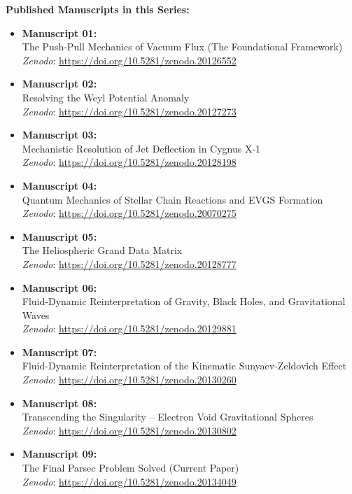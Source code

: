 \documentclass[11pt, a4paper]{article}
\begin{document}
  \vspace{1em}
  \noindent \textbf{Published Manuscripts in this Series:}
  \begin{itemize}
    \item \textbf{Manuscript 01:} \\ The Push-Pull Mechanics of Vacuum Flux (The Foundational Framework) \\ \textit{Zenodo}: \url{https://doi.org/10.5281/zenodo.20126552}
    
    \item \textbf{Manuscript 02:} \\ Resolving the Weyl Potential Anomaly \\ \textit{Zenodo}: \url{https://doi.org/10.5281/zenodo.20127273}

    \item \textbf{Manuscript 03:} \\ Mechanistic Resolution of Jet Deflection in Cygnus X-1 \\ \textit{Zenodo}: \url{https://doi.org/10.5281/zenodo.20128198}

    \item \textbf{Manuscript 04:} \\ Quantum Mechanics of Stellar Chain Reactions and EVGS Formation \\ \textit{Zenodo}: \url{https://doi.org/10.5281/zenodo.20070275}

    \item \textbf{Manuscript 05:} \\ The Heliospheric Grand Data Matrix \\ \textit{Zenodo}: \url{https://doi.org/10.5281/zenodo.20128777}

    \item \textbf{Manuscript 06:} \\ Fluid-Dynamic Reinterpretation of Gravity, Black Holes, and Gravitational Waves \\ \textit{Zenodo}: \url{https://doi.org/10.5281/zenodo.20129881}

    \item \textbf{Manuscript 07:} \\ Fluid-Dynamic Reinterpretation of the Kinematic Sunyaev-Zeldovich Effect \\ \textit{Zenodo}: \url{https://doi.org/10.5281/zenodo.20130260}

    \item \textbf{Manuscript 08:} \\ Transcending the Singularity -- Electron Void Gravitational Spheres \\ \textit{Zenodo}: \url{https://doi.org/10.5281/zenodo.20130802}

    \item \textbf{Manuscript 09:} \\ The Final Parsec Problem Solved (Current Paper) \\ \textit{Zenodo}: \url{https://doi.org/10.5281/zenodo.20134049}
  \end{itemize}
\end{document}
